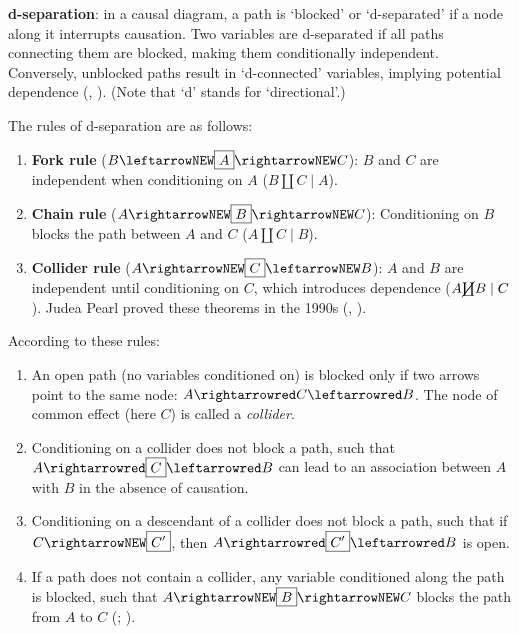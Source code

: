 \documentclass[
  single column]{article}
\providecommand{\tightlist}{%
  \setlength{\itemsep}{0pt}\setlength{\parskip}{0pt}}\usepackage{longtable,booktabs,array}
\begin{document}
\textbf{d-separation}: in a causal diagram, a path is `blocked' or
`d-separated' if a node along it interrupts causation. Two variables are
d-separated if all paths connecting them are blocked, making them
conditionally independent. Conversely, unblocked paths result in
`d-connected' variables, implying potential dependence
(, ).
(Note that `d' stands for `directional'.)

The rules of d-separation are as follows:

\begin{enumerate}
\def\labelenumi{\arabic{enumi}.}
\tightlist
\item
  \textbf{Fork rule} (\(B \leftarrowNEW \boxed{A} \rightarrowNEW C\)):
  \(B\) and \(C\) are independent when conditioning on \(A\)
  (\(B \coprod C \mid A\)).
\item
  \textbf{Chain rule} (\(A \rightarrowNEW \boxed{B} \rightarrowNEW C\)):
  Conditioning on \(B\) blocks the path between \(A\) and \(C\)
  (\(A \coprod C \mid B\)).
\item
  \textbf{Collider rule}
  (\(A \rightarrowNEW \boxed{C} \leftarrowNEW B\)): \(A\) and \(B\) are
  independent until conditioning on \(C\), which introduces dependence
  (\(A \cancel{\coprod} B \mid C\)). Judea Pearl proved these theorems
  in the 1990s (,
  ).
\end{enumerate}

According to these rules:

\begin{enumerate}
\def\labelenumi{\arabic{enumi}.}
\tightlist
\item
  An open path (no variables conditioned on) is blocked only if two
  arrows point to the same node: \(A \rightarrowred C \leftarrowred B\).
  The node of common effect (here \(C\)) is called a \emph{collider}.
\item
  Conditioning on a collider does not block a path, such that
  \(A \rightarrowred \boxed{C} \leftarrowred B\) can lead to an
  association between \(A\) with \(B\) in the absence of causation.
\item
  Conditioning on a descendant of a collider does not block a path, such
  that if \(C \rightarrowNEW \boxed{C'}\), then
  \(A \rightarrowred \boxed{C'} \leftarrowred B\) is open.
\item
  If a path does not contain a collider, any variable conditioned along
  the path is blocked, such that
  \(A \rightarrowNEW \boxed{B} \rightarrowNEW C\) blocks the path from
  \(A\) to \(C\) (; ).
\end{enumerate}
\end{document}
